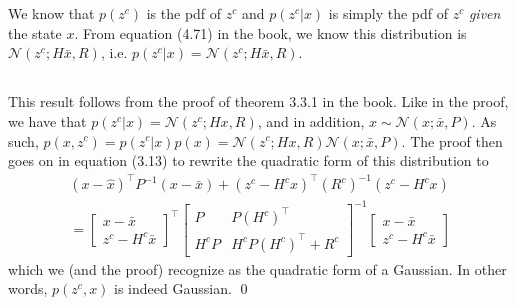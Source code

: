 \documentclass[]{article}
\begin{document}
\section{}
\subsection{}
We know that $p(z^c)$ is the pdf of $z^c$ and $p(z^c|x)$ is simply the pdf of $z^c$ \textit{given} the state $x$. From equation (4.71) in the book, we know this distribution is $\mathcal{N}(z^c; H \bar x, R)$, i.e. $p(z^c|x) = \mathcal{N}(z^c; H \bar x, R)$.

\subsection{}
This result follows from the proof of theorem 3.3.1 in the book. Like in the proof, we have that $p(z^c|x) = \mathcal{N}(z^c; Hx, R)$, and in addition, $x \sim \mathcal{N}(x; \bar x, P)$. As such, $p(x, z^c) = p(z^c|x)p(x) = \mathcal{N}(z^c; Hx, R) \mathcal{N}(x; \bar x, P)$. The proof then goes on in equation (3.13) to rewrite the quadratic form of this distribution to
\begin{equation}\begin{aligned}
(x - \hat x)^\top P^{-1}(x-\bar x) + (z^c - H^c x)^{\top} (R^c)^{-1}(z^c - H^c x) \\
=
\begin{bmatrix}
x - \bar x \\
z^c - H^c \bar x
\end{bmatrix}^\top
\begin{bmatrix}
P & P(H^c)^\top \\
H^c P & H^cP(H^c)^\top + R^c
\end{bmatrix}^{-1}
\begin{bmatrix}
x - \bar x \\
z^c - H^c \bar x
\end{bmatrix}
\end{aligned}\end{equation}
which we (and the proof) recognize as the quadratic form of a Gaussian. In other words, $p(z^c,x)$ is indeed Gaussian. \qed
\end{document}
